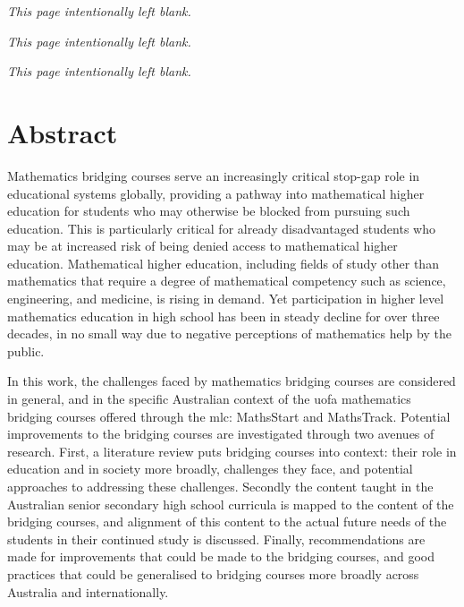 \documentclass[twoside,12pt,a4paper]{report}
\makeatletter
\newcommand*{\intentionallyblankpage}{
  \vspace*{\fill}
  {\centering \textit{This page intentionally left blank.} \par}
  \vspace{\fill}}
\renewcommand*{\cleardoublepage}{\clearpage\if@twoside \ifodd\c@page\else
  \intentionallyblankpage
  \newpage
  \if@twocolumn\hbox{}\newpage\fi\fi\fi}
\makeatother
\begin{document}



\setcounter{page}{2}
\intentionallyblankpage
\newpage
\intentionallyblankpage
\tableofcontents
{}



\glsaddall
\printglossaries
{}



\glsresetall
\cleardoublepage
\chapter*{Abstract}

Mathematics bridging courses serve an increasingly critical stop-gap role in educational systems globally, providing a pathway into mathematical higher education for students who may otherwise be blocked from pursuing such education. This is particularly critical for already disadvantaged students who may be at increased risk of being denied access to mathematical higher education. Mathematical higher education, including fields of study other than mathematics that require a degree of mathematical competency such as science, engineering, and medicine, is rising in demand. Yet participation in higher level mathematics education in high school has been in steady decline for over three decades, in no small way due to negative perceptions of mathematics help by the public. 

In this work, the challenges faced by mathematics bridging courses are considered in general, and in the specific Australian context of the \gls{uofa} mathematics bridging courses offered through the \gls{mlc}: MathsStart and MathsTrack. Potential improvements to the bridging courses are investigated through two avenues of research. First, a literature review puts bridging courses into context: their role in education and in society more broadly, challenges they face, and potential approaches to addressing these challenges. Secondly the content taught in the Australian senior secondary high school curricula is mapped to the content of the bridging courses, and alignment of this content to the actual future needs of the students in their continued study is discussed. Finally, recommendations are made for improvements that could be made to the bridging courses, and good practices that could be generalised to bridging courses more broadly across Australia and internationally.
\end{document}
